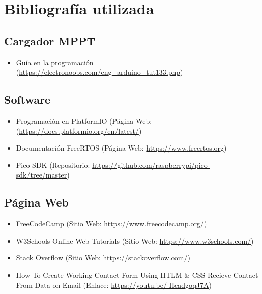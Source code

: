 \chapter{Bibliografía utilizada}
    
        \section{Cargador MPPT}
        
            \begin{itemize} [label=•]
                \setlength{\itemindent}{3em}
                \item Guía en la programación (\href{https://electronoobs.com/eng_arduino_tut133.php}{https://electronoobs.com/eng\_arduino\_tut133.php})
            \end{itemize}

        \section{Software}
        
            \begin{itemize} [label=•]
                \setlength{\itemindent}{3em}
                \item Programación en PlatformIO (Página Web: (\href{https://docs.platformio.org/en/latest/}{https://docs.platformio.org/en/latest/})
                \item Documentación FreeRTOS (Página Web: \href{https://www.freertos.org}{https://www.freertos.org})
                \item Pico SDK (Repositorio: \href{https://github.com/raspberrypi/pico-sdk/tree/master}{https://github.com/raspberrypi/pico-sdk/tree/master})
            \end{itemize}
            
        \section{Página Web}
        
            \begin{itemize} [label=•]
                \setlength{\itemindent}{3em}
                \item FreeCodeCamp (Sitio Web: \href{https://www.freecodecamp.org/}{https://www.freecodecamp.org/})
                \item W3Schools Online Web Tutorials (Sitio Web: \href{https://www.w3schools.com/}{https://www.w3schools.com/})
                \item Stack Overflow (Sitio Web: \href{https://stackoverflow.com/}{https://stackoverflow.com/})
                \item How To Create Working Contact Form Using HTLM \& CSS Recieve Contact From Data on Email (Enlace: \href{https://youtu.be/-HeadgoqJ7A}{https://youtu.be/-HeadgoqJ7A})
            \end{itemize}
            
